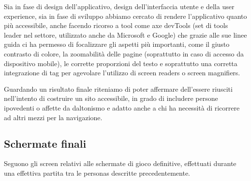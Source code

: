 \noindent Sia in fase di design dell'applicativo, design dell'interfaccia utente e della user experience, sia in fase di sviluppo abbiamo cercato di rendere l'applicativo quanto più accessibile, anche facendo ricorso a tool come axe devTools (set di tools leader nel settore, utilizzato anche da Microsoft e Google) che grazie alle sue linee guida ci ha permesso di focalizzare gli aspetti più importanti, come il giusto contrasto di colore, la zoomabilità delle pagine (soprattutto in caso di accesso da dispositivo mobile), le corrette proporzioni del testo e soprattutto una corretta integrazione di tag per agevolare l'utilizzo di screen readers o screen magnifiers.\newline

\noindent Guardando un risultato finale riteniamo di poter affermare dell'essere riusciti nell'intento di costruire un sito accessibile, in grado di includere persone ipovedenti o affette da daltonismo e adatto anche a chi ha necessità di ricorrere ad altri mezzi per la navigazione.

\subsection{Schermate finali}
Seguono gli screen relativi alle schermate di gioco definitive, effettuati durante una effettiva partita tra le personas descritte precedentemente.

